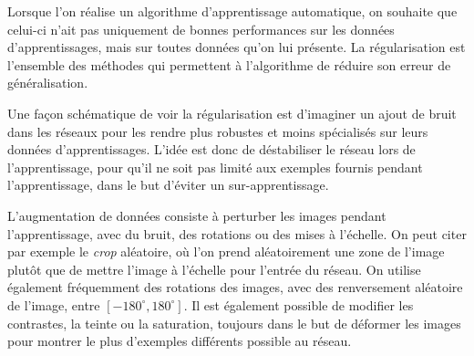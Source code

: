Lorsque l'on réalise un algorithme d'apprentissage automatique, on souhaite que celui-ci n’ait pas uniquement de bonnes performances sur les données d'apprentissages, mais sur toutes données qu'on lui présente.
La régularisation est l'ensemble des méthodes qui permettent à l'algorithme de réduire son erreur de généralisation.

\vspace{5mm}
\begin{center}
\end{center}
\vspace{5mm}


Une façon schématique de voir la régularisation est d'imaginer un ajout de bruit dans les réseaux pour les rendre plus robustes et moins spécialisés sur leurs données d'apprentissages.
L'idée est donc de déstabiliser le réseau lors de l'apprentissage, pour qu'il ne soit pas limité aux exemples fournis pendant l'apprentissage, dans le but d'éviter un sur-apprentissage.

\vspace{5mm}
\begin{center}
\end{center}
\vspace{5mm}

L'augmentation de données consiste à perturber les images pendant l'apprentissage, avec du bruit, des rotations ou des mises à l'échelle.
On peut citer par exemple le \textit{crop} aléatoire, où l'on prend aléatoirement une zone de l'image plutôt que de mettre l'image à l'échelle pour l'entrée du réseau.
On utilise également fréquemment des rotations des images, avec des renversement aléatoire de l'image, entre $ \left [ -180^\circ, 180^\circ \right ] $.
Il est également possible de modifier les contrastes, la teinte ou la saturation, toujours dans le but de déformer les images pour montrer le plus d'exemples différents possible au réseau.


